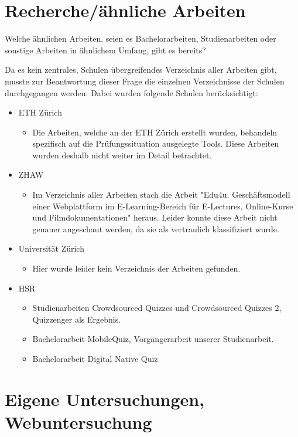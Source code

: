 \section{Recherche/ähnliche Arbeiten}

Welche ähnlichen Arbeiten, seien es Bachelorarbeiten, Studienarbeiten oder sonstige Arbeiten in ähnlichem Umfang, gibt es bereits?

Da es kein zentrales, Schulen übergreifendes Verzeichnis aller Arbeiten gibt, musste zur Beantwortung dieser Frage die einzelnen Verzeichnisse der Schulen durchgegangen werden. Dabei wurden folgende Schulen berücksichtigt:
\begin{itemize}
	\item ETH Zürich
	\begin{itemize}
		\item Die Arbeiten, welche an der ETH Zürich erstellt wurden, behandeln spezifisch auf die Prüfungssituation ausgelegte Tools. Diese Arbeiten wurden deshalb nicht weiter im Detail betrachtet. 
	\end{itemize}
	\item ZHAW
	\begin{itemize}
		\item Im Verzeichnis aller Arbeiten stach die Arbeit "Edu4u. Geschäftsmodell einer Webplattform im E-Learning-Bereich für E-Lectures, Online-Kurse und Filmdokumentationen" heraus. Leider konnte diese Arbeit nicht genauer angeschaut werden, da sie als vertraulich klassifiziert wurde.
	\end{itemize}
	\item Universität Zürich
	\begin{itemize}
		\item Hier wurde leider kein Verzeichnis der Arbeiten gefunden.
	\end{itemize}
	\item HSR
	\begin{itemize}
		\item Studienarbeiten Crowdsourced Quizzes und Crowdsourced Quizzes 2, Quizzenger als Ergebnis.
		\item Bachelorarbeit MobileQuiz, Vorgängerarbeit unserer Studienarbeit.
		\item Bachelorarbeit Digital Native Quiz
	\end{itemize}
\end{itemize}


\newpage
\section{Eigene Untersuchungen, Webuntersuchung}

